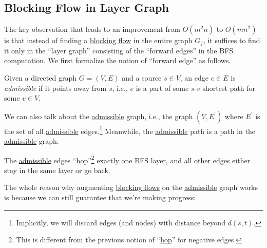 \subsection{Blocking Flow in Layer Graph}
The key observation that leads to an improvement from \(O(m^2 n)\) to \(O(mn^2)\) is that instead of finding a \hyperref[def:blocking-flow]{blocking flow} in the entire graph \(G_f\), it suffices to find it only in the ``layer graph'' consisting of the ``forward edges'' in the BFS computation. We first formalize the notion of ``forward edge'' as follows.

\begin{definition}[Admissible]\label{def:admissible}
	Given a directed graph \(G = (V, E)\) and a source \(s \in V\), an edge \(e \in E\) is \emph{admissible} if it points away from \(s\), i.e., \(e\) is a part of some \(s\)-\(v\) shortest path for some \(v \in V\).
\end{definition}

We can also talk about the \hyperref[def:admissible]{admissible} graph, i.e., the graph \((V, E^{\prime} )\) where \(E^{\prime} \) is the set of all \hyperref[def:admissible]{admissible} edges.\footnote{Implicitly, we will discard edges (and nodes) with distance beyond \(d(s, t)\).} Meanwhile, the \hyperref[def:admissible]{admissible} path is a path in the \hyperref[def:admissible]{admissible} graph.

\begin{note}
	The \hyperref[def:admissible]{admissible} edges ``hop''\footnote{This is different from the previous notion of ``\hyperref[not:hop]{hop}'' for negative edges.} exactly one BFS layer, and all other edges either stay in the same layer or go back.
\end{note}

The whole reason why augmenting \hyperref[def:blocking-flow]{blocking flows} on the \hyperref[def:admissible]{admissible} graph works is because we can still guarantee that we're making progress:

